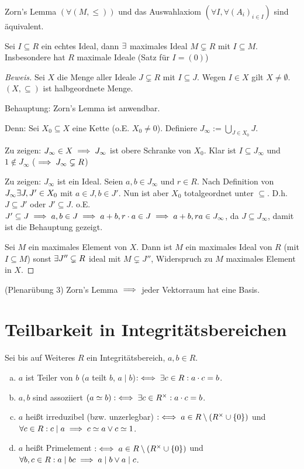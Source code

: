 \documentclass[a4paper]{report}
\begin{document}
\begin{satz*}
Zorn's Lemma $(\forall (M, \le))$ und das Auswahlaxiom $(\forall I, \forall (A_{i})_{i \in I})$ sind äquivalent.
\end{satz*}
\begin{satz}
  Sei $I \subseteq R$ ein echtes Ideal, dann $\exists$ maximales Ideal $M \subsetneq R$ mit $I \subseteq M$. Insbesondere hat $R$ maximale Ideale (Satz für $I = (0)$)
  \begin{proof}[Beweis]
    Sei $X$ die Menge aller Ideale $J \subsetneq R$ mit $I \subseteq J$. Wegen $I \in X$ gilt $X \ne \emptyset$. $(X, \subseteq)$ ist halbgeordnete Menge.
    \item Behauptung: Zorn's Lemma ist anwendbar.
    \item Denn: Sei $X_{0} \subseteq X$ eine Kette (o.E. $X_{0} \ne 0$). Definiere $J_{\infty} := \bigcup_{J \in X_{0}}J$.
    \item Zu zeigen: $J_{\infty} \in X \implies J_{\infty}$ ist obere Schranke von $X_{0}$. Klar ist $I \subseteq J_{\infty}$ und $1 \notin J_{\infty}$ ($\implies J_{\infty} \subsetneq R$)
    \item Zu zeigen: $J_{\infty}$ ist ein Ideal. Seien $a, b \in J_{\infty}$ und $r \in R$. Nach Definition von $J_{\infty} \exists J, J' \in X_{0}$ mit $a \in J, b \in J'$. Nun ist aber $X_{0}$ totalgeordnet unter $\subseteq$. D.h. $J \subseteq J'$ oder $J' \subseteq J$. o.E. $J' \subseteq J \implies a, b \in J \implies a + b, r \cdot a \in J \implies a+b , ra \in J_{\infty}$, da $J \subseteq J_{\infty}$, damit ist die Behauptung gezeigt.
    \item Sei $M$ ein maximales Element von $X$. Dann ist $M$ ein maximales Ideal von $R$ (mit $I \subseteq M$) sonst $\exists J'' \subsetneq R$ ideal mit $M \subsetneq J''$, Widerspruch zu $M$ maximales Element in $X$.
  \end{proof}
\end{satz}
\begin{ubng*} (Plenarübung 3)
Zorn's Lemma $\implies$ jeder Vektorraum hat eine Basis.
\end{ubng*}
\section{Teilbarkeit in Integritätsbereichen}%
\begin{defi}
  Sei bis auf Weiteres $R$ ein Integritätsbereich, $a, b \in R$.
  \begin{enumerate}[(a)]
    \item $a$ ist Teiler von $b$ ($a$ teilt $b$, $a \mid b$)$:\iff \exists c \in R : a \cdot c = b$.
    \item $a, b$ sind assoziiert $(a \simeq b):\iff \exists c \in R^\times : a \cdot c = b$.
    \item $a$ heißt irreduzibel (bzw. unzerlegbar) $:\iff a \in R \setminus (R ^\times \cup \{0\})$ und $\forall c \in R : c \mid a \implies c \simeq a \vee c \simeq 1$.
    \item $a$ heißt Primelement $:\iff a \in R \setminus (R^\times \cup \{0\})$ und $\forall b, c \in R : a \mid bc \implies a \mid b \vee a \mid c$.
  \end{enumerate}
\end{defi}
\end{document}
